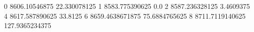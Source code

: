 0 8606.10546875 22.330078125
1 8583.775390625 0.0
2 8587.236328125 3.4609375
4 8617.587890625 33.8125
6 8659.4638671875 75.6884765625
8 8711.7119140625 127.9365234375
